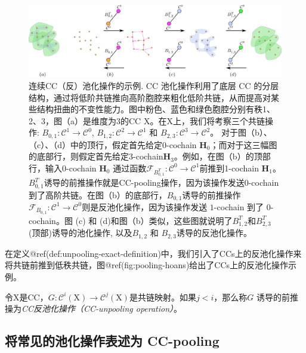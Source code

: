 \documentclass[
  12pt,
]{krantz}
\begin{document}
\begin{figure}

{\centering \includegraphics{figures/pooling} 

}

\caption{连续CC（反）池化操作的示例. CC 池化操作利用了底层 CC 的分层结构，通过将低阶共链推向高阶胞腔来粗化低阶共链，从而提高对某些结构扭曲的不变性能力。图中粉色、蓝色和绿色胞腔分别有秩1、2、3，图（a）是维度为3的CC $\mbox{X}$。在$\mbox{X}$上，我们将考察三个共链操作: $B_{0,1} \colon\mathcal{C}^1\to\mathcal{C}^0$, $B_{1,2} \colon\mathcal{C}^2\to \mathcal{C}^1$ 和 $B_{2,3}\colon\mathcal{C}^3\to\mathcal{C}^2$。 对于图（b）、（c）、（d）中的顶行，假定首先给定0-cochain $\mathbf{H}_0$；而对于这三幅图的底部行，则假定首先给定3-cochain$\mathbf{H}_3$。例如，在图（b）的顶部行，输入0-cochain $\mathbf{H}_0$ 通过函数$\mathcal{F}_{B_{0,1}^T}\colon\mathcal{C}^0\to \mathcal{C}^1$前推到1-cochain $\mathbf{H}_1$。$B_{0,1}^T$诱导的前推操作就是CC-pooling操作，因为该操作发送0-cochain到了高阶共链。在图（b）的底部行，$B_{0,1}$诱导的前推操作 $\mathcal{F}_{B_{0,1}}\colon \mathcal{C}^1\to \mathcal{C}^0$则是反池化操作，因为该操作发送 $1$-cochain 到了 $0$-cochain。图 (c) 和 (d)和图（b）类似，这些图就说明了$B_{1,2}^T$和$B_{2,3}^T$ (顶部)诱导的池化操作, 以及$B_{1,2}$ 和 $B_{2,3}$诱导的反池化操作。}\label{fig:pooling-hoans}
\end{figure}

在定义@ref(def:unpooling-exact-definition)中，我们引入了CCs上的反池化操作来将共链前推到低秩共链，图@ref(fig:pooling-hoans)给出了CCs上的反池化操作示例。

\label{unpooling-exact-definition}
令\(\mbox{X}\)是CC，\(G\colon\mathcal{C}^i( \mbox{X})\to \mathcal{C}^j( \mbox{X})\)是共链映射。如果\(j<i\)，那么称\(G\)
诱导的前推操为\emph{CC反池化操作（CC-unpooling operation）}。

\subsection{将常见的池化操作表述为
CC-pooling}\label{formulating-common-pooling-operations-as-cc-pooling}
\end{document}

